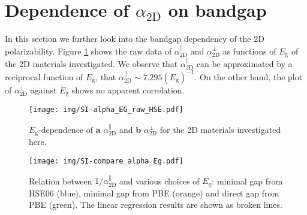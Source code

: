 \documentclass[manuscript=suppinfo,email=true,hyperref=true,keywords=false]{achemso}
\begin{document}
\section{Dependence of $\alpha_{\mathrm{2D}}$ on bandgap}
\label{sec:pol-2D-Eg}

In this section we further look into the bandgap dependency of the 2D
polarizability. Figure \ref{fig:SI-raw-HSE} shows the raw data of
$\alpha_{\mathrm{2D}}^{\parallel}$ and $\alpha_{\mathrm{2D}}^{\perp}$
as functions of $E_{\mathrm{g}}$ of the 2D materials investigated. We
observe that $\alpha_{\mathrm{2D}}^{\parallel}$ can be approximated by
a reciprocal function of $E_{\mathrm{g}}$, that
$\alpha_{\mathrm{2D}}^{\parallel}\sim{}
7.295(E_{\mathrm{g}})^{-1}$. On the other hand, the plot of
$\alpha_{\mathrm{2D}}^{\perp}$ against $E_{\mathrm{g}}$ shows no
apparent correlation.
\begin{figure}[htbp]
  \centering
  \texttt{[image: img/SI-alpha\_EG\_raw\_HSE.pdf]}
  \caption{$E_{\mathrm{g}}$-dependence of \textbf{a} $\alpha_{\mathrm{2D}}^{\parallel}$ and
    \textbf{b} $\alpha_{\mathrm{2D}}^{\perp}$ for the 2D materials investigated here.}
  \label{fig:SI-raw-HSE}
\end{figure}

\begin{figure}[htbp]
  \centering
  \texttt{[image: img/SI-compare\_alpha\_Eg.pdf]}
  \caption{Relation between $1/\alpha_{\mathrm{2D}}^{\parallel}$ and various choices
    of $E_{\mathrm{g}}$: minimal gap from HSE06 (blue), minimal gap
    from PBE (orange) and direct gap from PBE (green). The linear
    regression results are shown as broken lines.}
  \label{fig:alpha-Eg-diff}
\end{figure}
\end{document}
